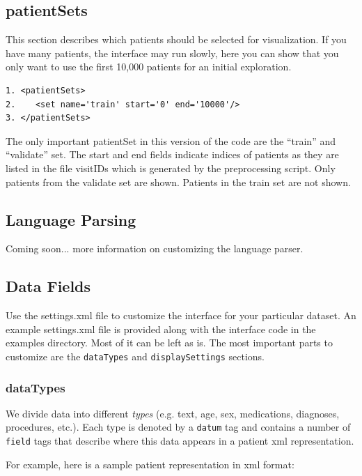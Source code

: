 \documentclass[12pt]{article}
\begin{document}
\subsection{patientSets}
This section describes which patients should be selected for visualization. If you have many patients, the interface may run slowly, here you can show that you only want to use the first 10,000 patients for an initial exploration.

\begin{verbatim}
1. <patientSets>
2.    <set name='train' start='0' end='10000'/>
3. </patientSets>
\end{verbatim}

The only important patientSet in this version of the code are the ``train'' and ``validate'' set. 
The start and end fields indicate indices of patients as they are listed in the file visitIDs which is generated by the preprocessing script.
Only patients from the validate set are shown. Patients in the train set are not shown.

\subsection{Language Parsing}
\label{sec:custom_language_processing}
Coming soon... more information on customizing the language parser.


\subsection{Data Fields}
\label{sec:custom_settings}
Use the settings.xml file to customize the interface for your particular dataset. An example settings.xml file is provided along with the interface code in the examples directory. Most of it can be left as is. The most important parts to customize are the {\tt dataTypes} and {\tt displaySettings} sections.


\subsubsection{dataTypes}
\label{sec:dataTypes}
We divide data into different {\em types} (e.g. text, age, sex, medications, diagnoses, procedures, etc.). Each type is denoted by a {\tt datum} tag and contains a number of {\tt field} tags that describe where this data appears in a patient xml representation.

For example, here is a sample patient representation in xml format:
\end{document}
